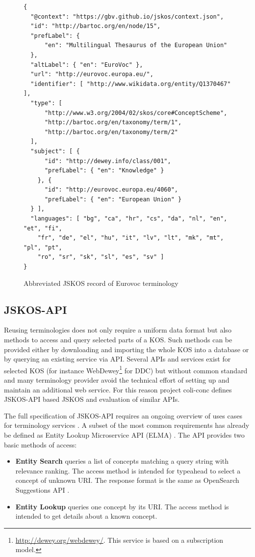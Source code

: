\documentclass[12pt,a4paper]{llncs}
\begin{document}
\begin{figure}
\begin{verbatim}
{
  "@context": "https://gbv.github.io/jskos/context.json",
  "id": "http://bartoc.org/en/node/15",
  "prefLabel": {
      "en": "Multilingual Thesaurus of the European Union"
  },
  "altLabel": { "en": "EuroVoc" },
  "url": "http://eurovoc.europa.eu/",
  "identifier": [ "http://www.wikidata.org/entity/Q1370467" ],
  "type": [
      "http://www.w3.org/2004/02/skos/core#ConceptScheme",
      "http://bartoc.org/en/taxonomy/term/1",
      "http://bartoc.org/en/taxonomy/term/2"
  ],
  "subject": [ {
      "id": "http://dewey.info/class/001",
      "prefLabel": { "en": "Knowledge" }
    }, {
      "id": "http://eurovoc.europa.eu/4060",
      "prefLabel": { "en": "European Union" }
  } ],
  "languages": [ "bg", "ca", "hr", "cs", "da", "nl", "en", "et", "fi",
    "fr", "de", "el", "hu", "it", "lv", "lt", "mk", "mt", "pl", "pt",
    "ro", "sr", "sk", "sl", "es", "sv" ]
}
\end{verbatim}
\caption{Abbreviated JSKOS record of Eurovoc terminology}
\label{fig:concept-scheme-example}
\end{figure}

\subsection{JSKOS-API}
Reusing terminologies does not only require a uniform data format but also methods to access and query selected parts of a KOS. Such methods can be provided either by downloading and importing the whole KOS into a database or by querying an existing service via API. Several APIs and services exist for selected KOS (for instance WebDewey\footnote{\url{http://dewey.org/webdewey/}. This service is based on a subscription model.} for DDC) but without common standard and many terminology provider avoid the technical effort of setting up and maintain an additional web service. For this reason project coli-conc defines JSKOS-API based JSKOS and evaluation of similar APIs.

The full specification of JSKOS-API requires an ongoing overview of uses cases for terminology services \cite{voss2016a}. A subset of the most common requirements has already be defined as Entity Lookup Microservice API (ELMA) \cite{ELMA}. The API provides two basic methods of access:

\begin{itemize}

\item \textbf{Entity Search} queries a list of concepts matching a query string with relevance ranking. The access method is intended for typeahead to select a concept of unknown URI. The response format is the same as OpenSearch Suggestions API \cite{Clinton2006}. %

\item \textbf{Entity Lookup} queries one concept by its URI. The access method is intended to get details about a known concept.
\end{itemize}
\end{document}
